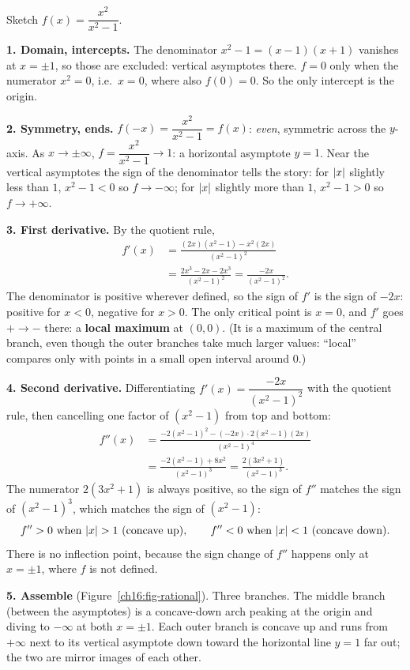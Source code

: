 \begin{example}\label{ch16:ex-sketch-rational}
Sketch $f(x)=\dfrac{x^2}{x^2-1}$.

\smallskip
\textbf{1. Domain, intercepts.} The denominator $x^2-1=(x-1)(x+1)$ vanishes at
$x=\pm1$, so those are excluded: vertical asymptotes there. $f=0$ only when the
numerator $x^2=0$, i.e.\ $x=0$, where also $f(0)=0$. So the only intercept is the
origin.

\textbf{2. Symmetry, ends.} $f(-x)=\dfrac{x^2}{x^2-1}=f(x)$: \emph{even}, symmetric
across the $y$-axis. As $x\to\pm\infty$, $f=\dfrac{x^2}{x^2-1}\to 1$: a horizontal
asymptote $y=1$. Near the vertical asymptotes the sign of the denominator tells the
story: for $\lvert x\rvert$ slightly less than $1$, $x^2-1<0$ so $f\to-\infty$; for
$\lvert x\rvert$ slightly more than $1$, $x^2-1>0$ so $f\to+\infty$.

\textbf{3. First derivative.} By the quotient rule,
\[
\begin{aligned}
f'(x)&=\frac{(2x)(x^2-1)-x^2(2x)}{(x^2-1)^2}\\
&=\frac{2x^3-2x-2x^3}{(x^2-1)^2}
=\frac{-2x}{(x^2-1)^2}.
\end{aligned}
\]
The denominator is positive wherever defined, so the sign of $f'$ is the sign of
$-2x$: positive for $x<0$, negative for $x>0$. The only critical point is $x=0$,
and $f'$ goes $+\to-$ there: a \textbf{local maximum} at $(0,0)$. (It is a maximum
of the central branch, even though the outer branches take much larger values:
``local'' compares only with points in a small open interval around $0$.)

\textbf{4. Second derivative.} Differentiating $f'(x)=\dfrac{-2x}{(x^2-1)^2}$ with
the quotient rule, then cancelling one factor of $(x^2-1)$ from top and bottom:
\[
\begin{aligned}
f''(x)&=\frac{-2(x^2-1)^2 - (-2x)\cdot 2(x^2-1)(2x)}{(x^2-1)^4}\\
&=\frac{-2(x^2-1) + 8x^2}{(x^2-1)^3}
=\frac{2(3x^2+1)}{(x^2-1)^3}.
\end{aligned}
\]
The numerator $2(3x^2+1)$ is always positive, so the sign of $f''$ matches the sign
of $(x^2-1)^3$, which matches the sign of $(x^2-1)$:
\[
f''>0 \text{ when } \abs{x}>1 \ (\text{concave up}),\qquad
f''<0 \text{ when } \abs{x}<1 \ (\text{concave down}).
\]
There is no inflection point, because the sign change of $f''$ happens only at
$x=\pm1$, where $f$ is not defined.

\textbf{5. Assemble} (Figure~\ref{ch16:fig-rational}). Three branches. The middle
branch (between the asymptotes) is a concave-down arch peaking at the origin and
diving to $-\infty$ at both $x=\pm1$. Each outer branch is concave up and runs
from $+\infty$ next to its vertical asymptote down toward the horizontal line
$y=1$ far out; the two are mirror images of each other.
\end{example}

